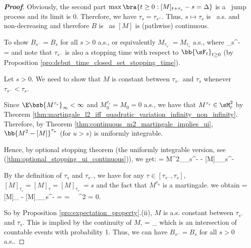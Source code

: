 \begin{proof}[\bf Proof]
Obviously, the second part $\max\bra{t\geq 0:[M]_{t+\tau_s} - s = \Delta}$ is a \cadlag\ jump process and its limit is 0. Therefore, we have %
$\tau_s = \tau_{s^+}$. Thus, $s \mapsto \tau_s$ is \cadlag\ a.s. and non-decreasing and therefore $B$ is \cadlag\ as $[M]$ is (pathwise) continuous.

To show $B_{s^-} = B_s$ for all $s > 0$ a.s., or equivalently $M_{\tau_{s^-}} = M_{\tau_s}$ a.s., where
\be
\tau_{s^-} = \inf{}
\ee
and note that $\tau_{s^-}$ is also a stopping time with respect to $\bb{\sF_t}_{t\geq 0}$ (by Proposition \ref{pro:debut_time_closed_set_stopping_time}).

Let $s > 0$. We need to show that $M$ is constant between $\tau_{s^-}$ and $\tau_s$ whenever $\tau_{s^-} < \tau_s$. %

Since $\E\bsb{M^{\tau_s}}_\infty < \infty$ and $M^{\tau_s}_0 = M_0 = 0$ a.s., we have that $M^{\tau_s} \in \sM_c^2$ by Theorem \ref{thm:martingale_l2_iff_quadratic_variation_infinity_non_infinity}.
Therefore, by Theorem \ref{thm:continuous_m2_martingale_implies_ui}, $\bb{M^2 - [M]}^{\tau_u}$ (for $u>s$) is uniformly integrable.

Hence, by optional stopping theorem (the uniformly integrable version, see (\ref{thm:optional_stopping_ui_continuous})), we get:
\be
\E{} = M^2_{\tau_{s^-}} - [M]_{\tau_{s^-}}\quad {}
\ee

By the definition of $\tau_s$ and $\tau_{s^-}$, we have for any $\tau\in [\tau_{s^-}, \tau_s]$, $[M]_{\tau_s} = [M]_{\tau} = [M]_{\tau_{s^-}} = s$
and the fact that $M^{\tau_u}$ is a martingale. %
we obtain
 =[M]_{\tau} - [M]_{\tau_{s^-}} = \E{} = \E{} \ \ra \ \E{}^2 = 0.
\ee

So by Proposition \ref{pro:expectation_property}.(ii), $M$ is a.s. constant between $\tau_{s^-}$ and $\tau_s$. This is implied by the continuity of $M$,
\be
{} = \bigcap_{\tau\in \Q{}}
\ee
which is an intersection of countable events with probability 1. Thus, we can have $B_{s^-} = B_s$ for all $s > 0$ a.s..


\end{proof}
